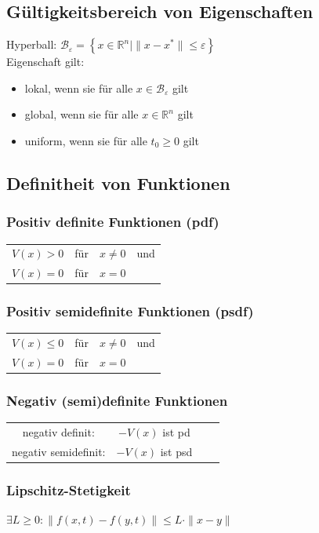 \documentclass[german]{latex4ei/latex4ei_sheet}
\begin{document}
\subsection{Gültigkeitsbereich von Eigenschaften}
Hyperball: $\mathcal{B}_\varepsilon = \left\{ x \in \mathbb{R}^n | \|x-x^*\| \leq \varepsilon \right\}$ \\
Eigenschaft gilt:
\begin{itemize}
  \item lokal, wenn sie für alle $x \in \mathcal{B}_\varepsilon$ gilt
  \item global, wenn sie für alle $x \in \mathbb{R}^n$ gilt
  \item uniform, wenn sie für alle $t_0 \geq 0$ gilt
\end{itemize}

\subsection{Definitheit von Funktionen}

\subsubsection*{Positiv definite Funktionen (pdf)}
\begin{tabular}{cccc}
  $V(x) > 0$ & für & $x \neq 0$ & und \\
  $V(x) = 0$ & für & $x = 0$ &
\end{tabular}

\subsubsection*{Positiv semidefinite Funktionen (psdf)}
\begin{tabular}{cccc}
  $V(x) \leq 0$ & für & $x \neq 0$ & und \\
  $V(x) = 0$ & für & $x = 0$ &
\end{tabular}

\subsubsection*{Negativ (semi)definite Funktionen}
\begin{tabular}{cccc}
  negativ definit: & $-V(x)$ ist pd \\
  negativ semidefinit: & $-V(x)$ ist psd
\end{tabular}


\subsubsection*{Lipschitz-Stetigkeit}
$\exists L \geq 0 : \| f(x,t) - f(y,t) \| \leq L \cdot \|x-y\| $
\end{document}
